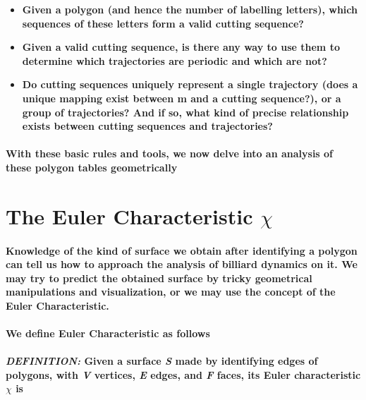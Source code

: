 \documentclass{report}
\begin{document}
\begin{itemize}

\item \textbf{Given a polygon (and hence the number of labelling letters), which sequences of these letters form a valid cutting sequence?}

\item \textbf{Given a valid cutting sequence, is there any way to use them to determine which trajectories are periodic and which are not?}

\item \textbf{Do cutting sequences uniquely represent a single trajectory (does a unique mapping exist between m and a cutting sequence?), or a group of trajectories? And if so, what kind of precise relationship exists between cutting sequences and trajectories?}

\end{itemize}

\paragraph{With these basic rules and tools, we now delve into an analysis of these polygon tables geometrically}

\section{The Euler Characteristic $\chi$}

\paragraph{Knowledge of the kind of surface we obtain after identifying a polygon can tell us how to approach the analysis of billiard dynamics on it. We may try to predict the obtained surface by tricky geometrical manipulations and visualization, or we may use the concept of the Euler Characteristic.}

\paragraph{We define Euler Characteristic as follows}

\paragraph{\textit{DEFINITION:} Given a surface \textit{S} made by identifying edges of polygons, with \textit{V} vertices, \textit{E} edges, and \textit{F} faces, its Euler characteristic $\chi$ is}
\end{document}
